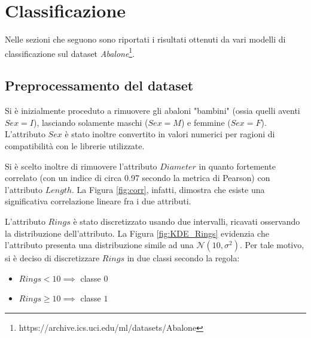 \documentclass[a4paper]{article}
\begin{document}
\newpage

\section{Classificazione}

Nelle sezioni che seguono sono riportati i risultati ottenuti da vari modelli di classificazione sul dataset \emph{Abalone}\footnote{https://archive.ics.uci.edu/ml/datasets/Abalone}.

\subsection{Preprocessamento del dataset}
Si è inizialmente proceduto a rimuovere gli abaloni "bambini" (ossia quelli aventi $Sex=I$), lasciando solamente maschi ($Sex=M$) e femmine ($Sex=F$). L'attributo $Sex$ è stato inoltre convertito in valori numerici per ragioni di compatibilità con le librerie utilizzate.

Si è scelto inoltre di rimuovere l'attributo $Diameter$ in quanto fortemente correlato (con un indice di circa 0.97 secondo la metrica di Pearson) con l'attributo $Length$. La Figura \ref{fig:corr}, infatti, dimostra che esiste una significativa correlazione lineare fra i due attributi.

L'attributo $Rings$ è stato discretizzato usando due intervalli, ricavati osservando la distribuzione dell'attributo. La Figura \ref{fig:KDE_Rings} evidenzia che l'attributo presenta una distribuzione simile ad una $\mathcal{N}(10, \sigma^2)$. Per tale motivo, si è deciso di discretizzare $Rings$ in due classi secondo la regola:
\begin{itemize}
	\item $Rings<10 \implies$ classe $0$
	\item $Rings \geq 10 \implies$ classe $1$	
\end{itemize}


\end{document}

